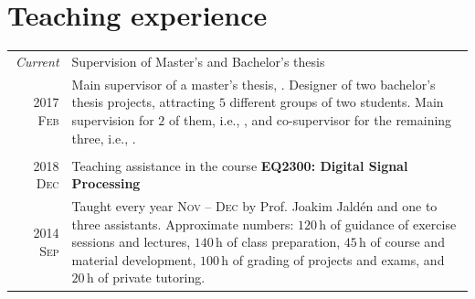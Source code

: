 \documentclass[a4paper,10pt]{article}
\begin{document}
  \section{Teaching experience}
  
    \begin{bibunit}
    \begin{tabular}{r|p{13cm}}
      
      \emph{Current}	 & Supervision of Master's and Bachelor's thesis \\
      \textsc{2017 Feb}  & \footnotesize{Main supervisor of a master's thesis, \cite{Jones2018}. 
							Designer of two bachelor's thesis projects, attracting $5$ 
							different groups of two students. Main supervision for $2$ of them,
							i.e., \cite{F2A2018,F2B2018}, and co-supervisor for the remaining three,
							i.e., \cite{F3A2018,F3B2018,F3C2018}. } \\      
      \multicolumn{2}{c}{} \\
      
	  \textsc{2018 Dec}     & Teaching assistance in the course \textbf{EQ2300: Digital Signal Processing} \\
	  \textsc{2014 Sep} & \footnotesize{Taught every year \textsc{Nov -- Dec} by Prof. Joakim Jald\'{e}n and 
							one to three assistants. Approximate numbers: $120\,\mathrm{h}$ of guidance of 
							exercise sessions and lectures, $140\,\mathrm{h}$ of 
							class preparation, $45\,\mathrm{h}$ of course and material development,
							$100\,\mathrm{h}$ of grading of projects and exams, and $20\,\mathrm{h}$ of private tutoring.} \\
     
    \end{tabular}

	
      \renewcommand\refname{\normalsize{Supervised theses}}
	  \footnotesize{
      }
	\end{bibunit}
  

  \vspace{-10pt}
  
\end{document}
